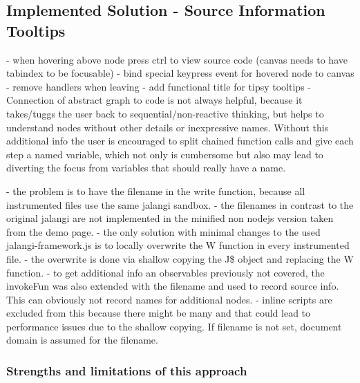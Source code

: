 	\subsection{Implemented Solution - Source Information Tooltips}
	- when hovering above node press ctrl to view source code (canvas needs to have tabindex to be focusable)
	- bind special keypress event for hovered node to canvas
	- remove handlers when leaving
	- add functional title for tipsy tooltips
	- Connection of abstract graph to code is not always helpful, because it takes/tuggs the user back to sequential/non-reactive thinking, but helps to understand nodes without other details or inexpressive names. Without this additional info the user is encouraged to split chained function calls and give each step a named variable, which not only is cumbersome but also may lead to diverting the focus from variables that should really have a name.
	
	- the problem is to have the filename in the write function, because all instrumented files use the same jalangi sandbox.
	- the filenames in contrast to the original jalangi are not implemented in the minified non nodejs version taken from the demo page.
	- the only solution with minimal changes to the used jalangi-framework.js is to locally overwrite the W function in every instrumented file.
	- the overwrite is done via shallow copying the J\$ object and replacing the W function.
	- to get additional info an observables previously not covered, the invokeFun was also extended with the filename and used to record source info. This can obviously not record names for additional nodes.
	- inline scripts are excluded from this because there might be many and that could lead to performance issues due to the shallow copying.
	If filename is not set, document domain is assumed for the filename.
	
	
		\subsubsection{Strengths and limitations of this approach} 


